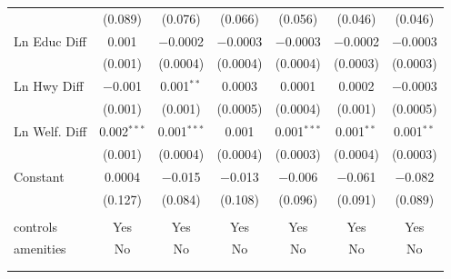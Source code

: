 \begin{table}[!htbp]
\begin{tabular}{@{\extracolsep{5pt}}lcccccc}
  & (0.089) & (0.076) & (0.066) & (0.056) & (0.046) & (0.046) \\ 
  Ln Educ Diff & 0.001 & $-$0.0002 & $-$0.0003 & $-$0.0003 & $-$0.0002 & $-$0.0003 \\ 
  & (0.001) & (0.0004) & (0.0004) & (0.0004) & (0.0003) & (0.0003) \\ 
  Ln Hwy Diff & $-$0.001 & 0.001$^{**}$ & 0.0003 & 0.0001 & 0.0002 & $-$0.0003 \\ 
  & (0.001) & (0.001) & (0.0005) & (0.0004) & (0.001) & (0.0005) \\ 
  Ln Welf. Diff & 0.002$^{***}$ & 0.001$^{***}$ & 0.001 & 0.001$^{***}$ & 0.001$^{**}$ & 0.001$^{**}$ \\ 
  & (0.001) & (0.0004) & (0.0004) & (0.0003) & (0.0004) & (0.0003) \\ 
  Constant & 0.0004 & $-$0.015 & $-$0.013 & $-$0.006 & $-$0.061 & $-$0.082 \\ 
  & (0.127) & (0.084) & (0.108) & (0.096) & (0.091) & (0.089) \\ 
 \hline \\[-1.8ex] 
controls & Yes & Yes & Yes & Yes & Yes & Yes \\ 
amenities & No & No & No & No & No & No \\ 
\hline \\[-1.8ex] 
\hline 
\hline \\[-1.8ex] 
\end{tabular} 
\end{table} 
